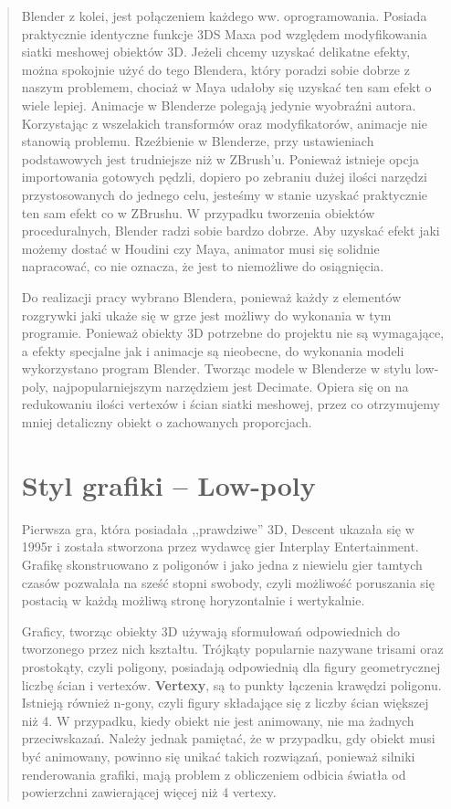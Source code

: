 \begin{quotation}
\indent Blender z kolei, jest połączeniem każdego ww. oprogramowania. Posiada praktycznie identyczne funkcje 3DS Maxa pod względem modyfikowania siatki meshowej obiektów 3D. Jeżeli chcemy uzyskać delikatne efekty, można spokojnie użyć do tego Blendera, który poradzi sobie dobrze z naszym problemem, chociaż w Maya udałoby się uzyskać ten sam efekt o wiele lepiej. Animacje w Blenderze polegają jedynie wyobraźni autora. Korzystając z wszelakich transformów oraz modyfikatorów, animacje nie stanowią problemu. Rzeźbienie w Blenderze, przy ustawieniach podstawowych jest trudniejsze niż w ZBrush'u. Ponieważ istnieje opcja importowania gotowych pędzli, dopiero po zebraniu dużej ilości narzędzi przystosowanych do jednego celu, jesteśmy w stanie uzyskać praktycznie ten sam efekt co w ZBrushu. W przypadku tworzenia obiektów proceduralnych, Blender radzi sobie bardzo dobrze. Aby uzyskać efekt jaki możemy dostać w Houdini czy Maya, animator musi się solidnie napracować, co nie oznacza, że jest to niemożliwe do osiągnięcia.

\indent Do realizacji pracy wybrano Blendera, ponieważ każdy z elementów rozgrywki jaki ukaże się w grze jest możliwy do wykonania w tym programie. Ponieważ obiekty 3D potrzebne do projektu nie są wymagające, a efekty specjalne jak i animacje są nieobecne, do wykonania modeli wykorzystano program Blender. Tworząc modele w Blenderze w stylu low-poly, najpopularniejszym narzędziem jest Decimate. Opiera się on na redukowaniu ilości vertexów i ścian siatki meshowej, przez co otrzymujemy mniej detaliczny obiekt o zachowanych proporcjach.
\section{Styl grafiki -- Low-poly}

\indent Pierwsza gra, która posiadała ,,prawdziwe'' 3D, Descent ukazała się w 1995r i została stworzona przez wydawcę gier Interplay Entertainment. Grafikę skonstruowano z poligonów i jako jedna z niewielu gier tamtych czasów pozwalała na sześć stopni swobody, czyli możliwość poruszania się postacią w każdą możliwą stronę horyzontalnie i wertykalnie.

\indent Graficy, tworząc obiekty 3D używają sformułowań odpowiednich do tworzonego przez nich kształtu. Trójkąty popularnie nazywane trisami oraz prostokąty, czyli poligony, posiadają odpowiednią dla figury geometrycznej liczbę ścian i vertexów. \textbf{Vertexy}, są to punkty łączenia krawędzi poligonu. Istnieją również n-gony, czyli figury składające się z liczby ścian większej niż 4. W przypadku, kiedy obiekt nie jest animowany, nie ma żadnych przeciwskazań. Należy jednak pamiętać, że w przypadku, gdy obiekt musi być animowany, powinno się unikać takich rozwiązań, ponieważ silniki renderowania grafiki, mają problem z obliczeniem odbicia światła od powierzchni zawierającej więcej niż 4 vertexy.


\end{quotation}
